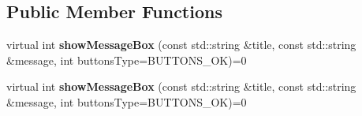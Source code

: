 \subsection*{Public Member Functions}
\begin{DoxyCompactItemize}
\item 
\mbox{\label{classPlayerMessageBoxServiceProtocol_a7b824f02fafef6ecca501641eaf0645f}} 
virtual int {\bfseries show\+Message\+Box} (const std\+::string \&title, const std\+::string \&message, int buttons\+Type=B\+U\+T\+T\+O\+N\+S\+\_\+\+OK)=0
\item 
\mbox{\label{classPlayerMessageBoxServiceProtocol_a7b824f02fafef6ecca501641eaf0645f}} 
virtual int {\bfseries show\+Message\+Box} (const std\+::string \&title, const std\+::string \&message, int buttons\+Type=B\+U\+T\+T\+O\+N\+S\+\_\+\+OK)=0
\end{DoxyCompactItemize}
